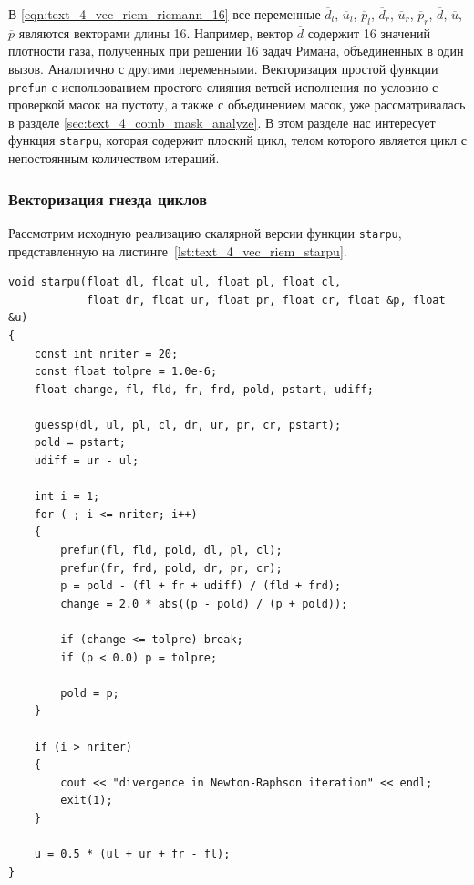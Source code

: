 В \eqref{eqn:text_4_vec_riem_riemann_16} все переменные $\overline{d}_l$, $\overline{u}_l$, $\overline{p}_l$, $\overline{d}_r$, $\overline{u}_r$, $\overline{p}_r$, $\overline{d}$, $\overline{u}$, $\overline{p}$ являются векторами длины 16.
Например, вектор $\overline{d}$ содержит 16 значений плотности газа, полученных при решении 16 задач Римана, объединенных в один вызов.
Аналогично с другими переменными.
Векторизация простой функции \texttt{prefun} с использованием простого слияния ветвей исполнения по условию\label{term:meth_vec_merge3} с проверкой масок на пустоту\label{term:meth_vec_check2}, а также с объединением масок\label{term:meth_vec_union2}, уже рассматривалась в разделе \ref{sec:text_4_comb_mask_analyze}.
В этом разделе нас интересует функция \texttt{starpu}, которая содержит плоский цикл, телом которого является цикл с непостоянным количеством итераций.

\subsubsection{Векторизация гнезда циклов}

Рассмотрим исходную реализацию скалярной версии функции \texttt{starpu}, представленную на листинге~\ref{lst:text_4_vec_riem_starpu}.

\begin{lstlisting}[caption={Оригинальная версия функции \texttt{starpu}.},label={lst:text_4_vec_riem_starpu}]
void starpu(float dl, float ul, float pl, float cl,
            float dr, float ur, float pr, float cr, float &p, float &u)
{
    const int nriter = 20;
    const float tolpre = 1.0e-6;
    float change, fl, fld, fr, frd, pold, pstart, udiff;

    guessp(dl, ul, pl, cl, dr, ur, pr, cr, pstart);
    pold = pstart;
    udiff = ur - ul;

    int i = 1;
    for ( ; i <= nriter; i++)
    {
        prefun(fl, fld, pold, dl, pl, cl);
        prefun(fr, frd, pold, dr, pr, cr);
        p = pold - (fl + fr + udiff) / (fld + frd);
        change = 2.0 * abs((p - pold) / (p + pold));

        if (change <= tolpre) break;
        if (p < 0.0) p = tolpre;

        pold = p;
    }

    if (i > nriter)
    {
        cout << "divergence in Newton-Raphson iteration" << endl;
        exit(1);
    }

    u = 0.5 * (ul + ur + fr - fl);
}
\end{lstlisting}

